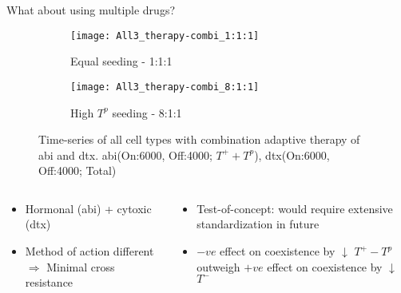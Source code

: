 \begin{frame}{What about using multiple drugs?}
  \begin{figure}[h]
    \begin{adjustwidth}{-5cm}{-5cm}
      \centering
      \begin{subfigure}[b]{0.53\textwidth}
        \centering
        \texttt{[image: All3\_therapy-combi\_1:1:1]}
        \caption{Equal seeding - 1:1:1}
      \end{subfigure}
      \begin{subfigure}[b]{0.53\textwidth}
        \centering
        \texttt{[image: All3\_therapy-combi\_8:1:1]}
        \caption{High $T^p$ seeding - 8:1:1}
      \end{subfigure}
    \end{adjustwidth}
    \caption{Time-series of all cell types with combination adaptive therapy of abi and dtx\footnotemark[1]. abi(On:6000, Off:4000; $T^+ + T^p$), dtx(On:6000, Off:4000; Total)}
  \end{figure}
  \begin{columns}
    \begin{column}{0.5\textwidth}
      \begin{itemize}
        \item<1-> Hormonal (abi\footnotemark[1]) + cytoxic (dtx\footnotemark[1]) \cite{West}
        \item<2-> Method of action different $\Rightarrow$ Minimal cross resistance
      \end{itemize}
    \end{column}
    \begin{column}{0.5\textwidth}
      \begin{itemize}
        \item<3-> Test-of-concept: would require extensive standardization in future
        \item<4-> $-ve$ effect on coexistence by $\downarrow$ $T^+ - T^p$ outweigh $+ve$ effect on coexistence by $\downarrow$ $T^-$
      \end{itemize}
    \end{column}
  \end{columns}
\end{frame}
